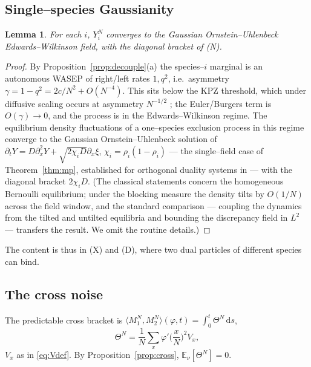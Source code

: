 \documentclass[11pt]{article}
\theoremstyle{plain}
\newtheorem{lemma}[theorem]{Lemma}
\theoremstyle{definition}
\theoremstyle{remark}
\newcommand{\E}{\mathbb{E}}\newcommand{\PP}{\mathbb{P}}\newcommand{\dd}{\,\mathrm{d}}
\begin{document}
\subsection{Single--species Gaussianity}
\begin{lemma}\label{lem:gauss}
For each $i$, $Y_i^N$ converges to the Gaussian Ornstein--Uhlenbeck
Edwards--Wilkinson field, with the diagonal bracket of \textup{(N)}.
\end{lemma}
\begin{proof}
By Proposition~\ref{prop:decouple}(a) the species--$i$ marginal is an autonomous WASEP
of right/left rates $1,q^2$, i.e.\ asymmetry $\gamma=1-q^2=2c/N^2+O(N^{-4})$. This sits
below the KPZ threshold, which under diffusive scaling occurs at asymmetry $N^{-1/2}$
\cite{GJ}; the Euler/Burgers term is $O(\gamma)\to0$, and the process is in the
Edwards--Wilkinson regime. The equilibrium density fluctuations of a one--species
exclusion process in this regime converge to the Gaussian Ornstein--Uhlenbeck solution
of $\partial_tY=D\partial_x^2Y+\sqrt{2\chi_i D}\partial_x\xi$, $\chi_i=\rho_i(1-\rho_i)$
--- the single--field case of Theorem~\ref{thm:mp}, established for orthogonal duality
systems in \cite{ACR2} --- with the diagonal bracket $2\chi_i D$. (The classical statements concern the homogeneous Bernoulli equilibrium;
under the blocking measure the density tilts by $O(1/N)$ across the field window, and
the standard comparison --- coupling the dynamics from the tilted and untilted
equilibria and bounding the discrepancy field in $L^2$ --- transfers the result. We
omit the routine details.)
\end{proof}

\noindent The content is thus in (X) and (D), where two dual particles of different
species can bind.

\subsection{The cross noise}
The predictable cross bracket is $\langle M_1^N,M_2^N\rangle(\varphi,t)=\int_0^t\Theta^N\dd s$,
\begin{equation}\label{eq:Theta}
  \Theta^N=\frac1N\sum_x\varphi'\Big(\frac xN\Big)^2 V_x,
\end{equation}
$V_x$ as in \eqref{eq:Vdef}. By Proposition~\ref{prop:cross}, $\E_\nu[\Theta^N]=0$.
\end{document}
